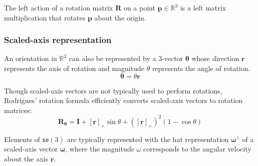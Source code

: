 		The left action of a rotation matrix $\mathbf{R}$ on a point $\mathbf{p} \in \mathbb{R}^3$ is a left matrix multiplication that rotates $\mathbf{p}$ about the origin.
		
		\subsubsection{Scaled-axis representation}
		An orientation in $\mathbb{R}^3$ can also be represented by a 3-vector $\bm{\theta}$ whose direction $\mathbf{r}$ represents the axis of rotation and magnitude $\theta$ represents the angle of rotation.
		\begin{equation}
			\bm{\theta} = \theta\mathbf{r}
		\end{equation}
		
		Though scaled-axis vectors are not typically used to perform rotations, Rodrigues' rotation formula efficiently converts scaled-axis vectors to rotation matrices:
		\begin{equation} \label{eq:rodrigues}
			\mathbf{R}_{\bm{\theta}} = \mathbf{I} + [\mathbf{r}]_{\times}\sin{\theta} + ([\mathbf{r}]_{\times})^2(1-\cos{\theta})
		\end{equation}
					
		Elements of $\mathfrak{so}(3)$ are typically represented with the hat representation $\bm{\omega}^{\wedge}$ of a scaled-axis vector $\bm{\omega}$, where the magnitude $\omega$ corresponds to the angular velocity about the axis $\mathbf{r}$.
					
